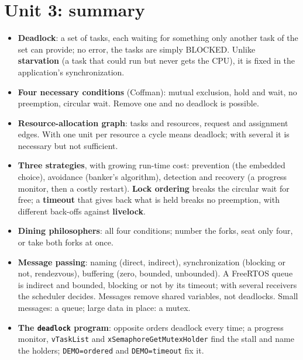 \section{Unit 3: summary}
\begin{itemize}
    \item \textbf{Deadlock}: a set of tasks, each waiting for something only another task of the set can provide; no error, the tasks are simply BLOCKED. Unlike \textbf{starvation} (a task that could run but never gets the CPU), it is fixed in the application's synchronization.
    \item \textbf{Four necessary conditions} (Coffman): mutual exclusion, hold and wait, no preemption, circular wait. Remove one and no deadlock is possible.
    \item \textbf{Resource-allocation graph}: tasks and resources, request and assignment edges. With one unit per resource a cycle means deadlock; with several it is necessary but not sufficient.
    \item \textbf{Three strategies}, with growing run-time cost: prevention (the embedded choice), avoidance (banker's algorithm), detection and recovery (a progress monitor, then a costly restart). \textbf{Lock ordering} breaks the circular wait for free; a \textbf{timeout} that gives back what is held breaks no preemption, with different back-offs against \textbf{livelock}.
    \item \textbf{Dining philosophers}: all four conditions; number the forks, seat only four, or take both forks at once.
    \item \textbf{Message passing}: naming (direct, indirect), synchronization (blocking or not, rendezvous), buffering (zero, bounded, unbounded). A FreeRTOS queue is indirect and bounded, blocking or not by its timeout; with several receivers the scheduler decides. Messages remove shared variables, not deadlocks. Small messages: a queue; large data in place: a mutex.
    \item \textbf{The \texttt{deadlock} program}: opposite orders deadlock every time; a progress monitor, \texttt{vTaskList} and \texttt{xSemaphoreGetMutexHolder} find the stall and name the holders; \texttt{DEMO=ordered} and \texttt{DEMO=timeout} fix it.
\end{itemize}

